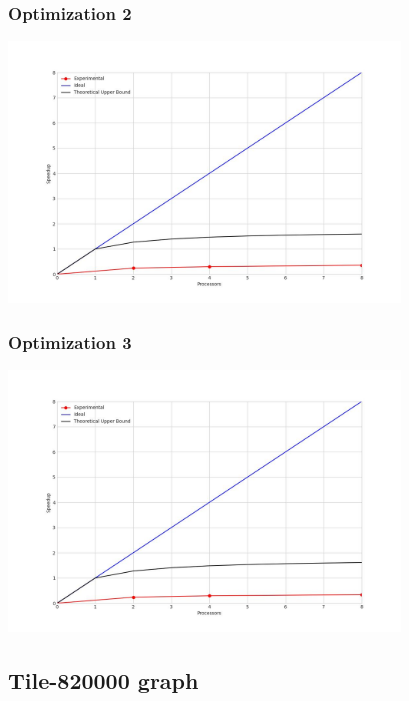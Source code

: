 \subsubsection{Optimization 2}
\begin{center}
    \resizebox{0.8\textwidth}{!}{}
    \includegraphics[width=0.78\textwidth]{../img/speedup-graph_type-tile-410000-O2}
\end{center}

\subsubsection{Optimization 3}
\begin{center}
    \resizebox{0.8\textwidth}{!}{}
    \includegraphics[width=0.78\textwidth]{../img/speedup-graph_type-tile-410000-O3}
\end{center}

\clearpage
\subsection{Tile-820000 graph}
